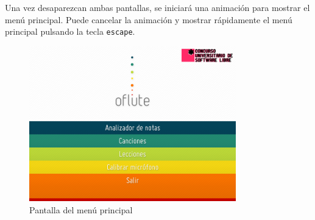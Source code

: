 Una vez desaparezcan ambas pantallas, se iniciará una animación para mostrar el
menú principal. Puede cancelar la animación y mostrar rápidamente el menú
principal pulsando la tecla \texttt{escape}.

\begin{figure}[h!]
  \centering
  \includegraphics[width=0.8\textwidth]{apendice_manual_usuario/imagen_menuPrincipal}
  \caption{Pantalla del menú principal}
  \vspace{-1cm}
\end{figure}




